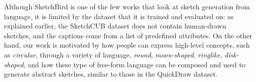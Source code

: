 Although SketchBird is one of the few works that look at sketch generation from language, it is limited by the dataset that it is trained and evaluated on: as explained earlier, the SketchCUB dataset does not contain human-drawn sketches, and the captions come from a list of predefined attributes. On the other hand, our work is motivated by how people can express high-level concepts, such as \textit{circular}, through a variety of language, \textit{round}, \textit{moon-shaped}, \textit{ringlike}, \textit{disk-shaped}, and how these type of free-form language can be composed and used to generate abstract sketches, similar to those in the QuickDraw dataset.     





